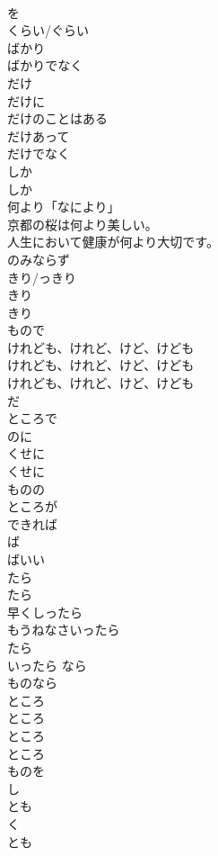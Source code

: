 \documentclass[8pt]{extreport}
\begin{document}
\begin{CJK}{UTF8}{min}
\\	を 
\\	くらい/ぐらい 
\\	ばかり	
\\	ばかりでなく	
\\	だけ 
\\	だけに	
\\	だけのことはある	
\\	だけあって	
\\	だけでなく	
\\	しか 
\\	しか 
\\	何より「なにより」	
\\	京都の桜は何より美しい。
\\	人生において健康が何より大切です。
\\	のみならず 
\\	きり/っきり
\\	きり 
\\	きり 
\\	もので	
\\	けれども、けれど、けど、けども 
\\	けれども、けれど、けど、けども 
\\	けれども、けれど、けど、けども 
\\	だ 
\\	ところで 
\\	のに 
\\	くせに	
\\	くせに 
\\	ものの	
\\	ところが	
\\	できれば	
\\	ば 
\\	ばいい	
\\	たら 
\\	たら 
\\	早くしったら
\\	もうねなさいったら 
\\	たら 
\\	いったら  なら 
\\	ものなら	
\\	ところ	
\\	ところ	
\\	ところ	
\\	ところ 
\\	ものを 
\\	し	
\\	とも 
\\	く 
\\	とも

\end{CJK}
\end{document}
